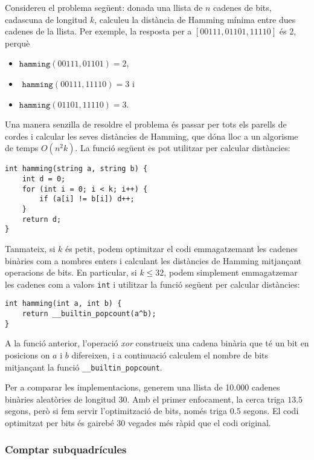Considereu el problema següent: donada una llista de $n$ cadenes de
bits, cadascuna de longitud $k$, calculeu la distància de Hamming
mínima entre dues cadenes de la llista. Per exemple, la resposta per a
$[00111,01101,11110]$ és 2, perquè
\begin{itemize}[noitemsep]
\item $\texttt{hamming}(00111,01101)=2$,
\item $\texttt{ hamming}(00111,11110)=3$ i
\item $\texttt{hamming}(01101,11110)=3$.
\end{itemize}

Una manera senzilla de resoldre el problema és passar per tots els
parells de cordes i calcular les seves distàncies de Hamming, que dóna
lloc a un algorisme de temps $O(n^2 k)$. La funció següent es pot
utilitzar per calcular distàncies:
\begin{lstlisting}
int hamming(string a, string b) {
    int d = 0;
    for (int i = 0; i < k; i++) {
        if (a[i] != b[i]) d++;
    }
    return d;
}
\end{lstlisting}


Tanmateix, si $k$ és petit, podem optimitzar el codi emmagatzemant les
cadenes binàries com a nombres enters i calculant les distàncies de
Hamming mitjançant operacions de bits. En particular, si $k \le 32$,
podem simplement emmagatzemar les cadenes com a valors \texttt{int} i
utilitzar la funció següent per calcular distàncies:
\begin{lstlisting}
int hamming(int a, int b) {
    return __builtin_popcount(a^b);
}
\end{lstlisting}
A la funció anterior, l'operació \emph{xor} construeix una cadena binària que
té un bit en posicions on $a$ i $b$ difereixen, i a continuació calculem
el nombre de bits mitjançant la funció \texttt{\_\_builtin\_popcount}.

Per a comparar les implementacions, generem una llista de 10.000
cadenes binàries aleatòries de longitud 30. Amb el primer enfocament, la
cerca triga $13.5$ segons, però si fem servir l'optimització de bits,
només triga $0.5$ segons. El codi optimitzat per bits és gairebé 30
vegades més ràpid que el codi original.

\subsubsection{Comptar subquadrícules}

